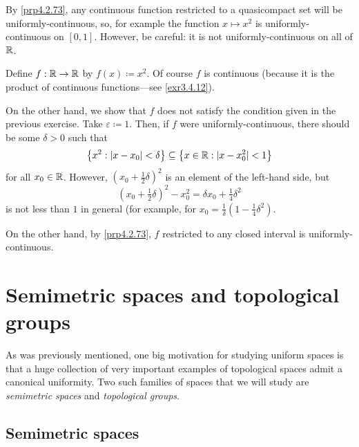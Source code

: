 \begin{exm}
By \cref{prp4.2.73}, any continuous function restricted to a quasicompact set will be uniformly-continuous, so, for example the function $x\mapsto x^2$ is uniformly-continuous on $[0,1]$.  However, be careful:  it is not uniformly-continuous on all of $\mathbb{R}$.
\end{exm}
\begin{exm}\label{exm4.2.85}
Define $f:\mathbb{R} \rightarrow \mathbb{R}$ by $f(x)\coloneqq x^2$.  Of course $f$ is continuous (because it is the product of continuous functions---see \cref{exr3.4.12}).

On the other hand, we show that $f$ does not satisfy the condition given in the previous exercise.  Take $\varepsilon \coloneqq 1$.  Then, if $f$ were uniformly-continuous, there should be some $\delta >0$ such that
\begin{equation}
\left\{ x^2:\lvert x-x_0\rvert<\delta \right\} \subseteq \left\{ x\in \mathbb{R} :\lvert x-x_0^2\rvert<1\right\} 
\end{equation}
for all $x_0\in \mathbb{R}$.  However, $(x_0+\frac{1}{2}\delta )^2$ is an element of the left-hand side, but
\begin{equation}
\left( x_0+\tfrac{1}{2}\delta \right) ^2-x_0^2=\delta x_0+\tfrac{1}{4}\delta ^2
\end{equation}
is not less than $1$ in general (for example, for $x_0=\frac{1}{\delta}(1-\tfrac{1}{4}\delta ^2)$.

On the other hand, by \cref{prp4.2.73}, $f$ restricted to any closed interval is uniformly-continuous.
\end{exm}

\section{Semimetric spaces and topological groups}

As was previously mentioned, one big motivation for studying uniform spaces is that a huge collection of very important examples of topological spaces admit a canonical uniformity.  Two such families of spaces that we will study are \emph{semimetric spaces} and \emph{topological groups}.

\subsection{Semimetric spaces}

